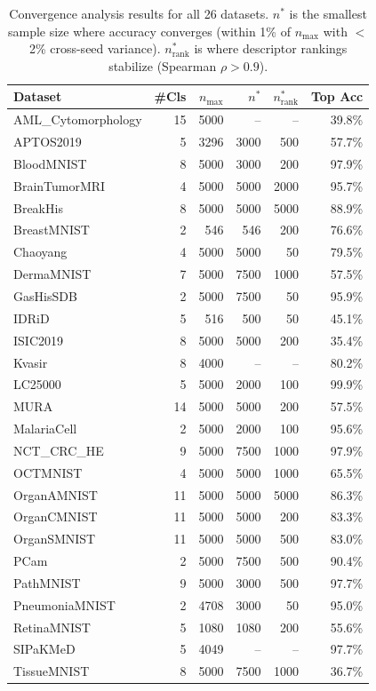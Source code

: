 \begin{table}[h]
\centering
\caption{Convergence analysis results for all 26 datasets. $n^*$ is the smallest sample size where accuracy converges (within 1\% of $n_{\max}$ with $<$2\% cross-seed variance). $n^*_{\text{rank}}$ is where descriptor rankings stabilize (Spearman $\rho > 0.9$).}
\label{tab:convergence}
\begin{tabular}{lrrrrr}
\toprule
Dataset & \#Cls & $n_{\max}$ & $n^*$ & $n^*_{\text{rank}}$ & Top Acc \\
\midrule
AML\_Cytomorphology & 15 & 5000 & -- & -- & 39.8\% \\
APTOS2019 & 5 & 3296 & 3000 & 500 & 57.7\% \\
BloodMNIST & 8 & 5000 & 3000 & 200 & 97.9\% \\
BrainTumorMRI & 4 & 5000 & 5000 & 2000 & 95.7\% \\
BreakHis & 8 & 5000 & 5000 & 5000 & 88.9\% \\
BreastMNIST & 2 & 546 & 546 & 200 & 76.6\% \\
Chaoyang & 4 & 5000 & 5000 & 50 & 79.5\% \\
DermaMNIST & 7 & 5000 & 7500 & 1000 & 57.5\% \\
GasHisSDB & 2 & 5000 & 7500 & 50 & 95.9\% \\
IDRiD & 5 & 516 & 500 & 50 & 45.1\% \\
ISIC2019 & 8 & 5000 & 5000 & 200 & 35.4\% \\
Kvasir & 8 & 4000 & -- & -- & 80.2\% \\
LC25000 & 5 & 5000 & 2000 & 100 & 99.9\% \\
MURA & 14 & 5000 & 5000 & 200 & 57.5\% \\
MalariaCell & 2 & 5000 & 2000 & 100 & 95.6\% \\
NCT\_CRC\_HE & 9 & 5000 & 7500 & 1000 & 97.9\% \\
OCTMNIST & 4 & 5000 & 5000 & 1000 & 65.5\% \\
OrganAMNIST & 11 & 5000 & 5000 & 5000 & 86.3\% \\
OrganCMNIST & 11 & 5000 & 5000 & 200 & 83.3\% \\
OrganSMNIST & 11 & 5000 & 5000 & 500 & 83.0\% \\
PCam & 2 & 5000 & 7500 & 500 & 90.4\% \\
PathMNIST & 9 & 5000 & 3000 & 500 & 97.7\% \\
PneumoniaMNIST & 2 & 4708 & 3000 & 50 & 95.0\% \\
RetinaMNIST & 5 & 1080 & 1080 & 200 & 55.6\% \\
SIPaKMeD & 5 & 4049 & -- & -- & 97.7\% \\
TissueMNIST & 8 & 5000 & 7500 & 1000 & 36.7\% \\
\bottomrule
\end{tabular}
\end{table}
